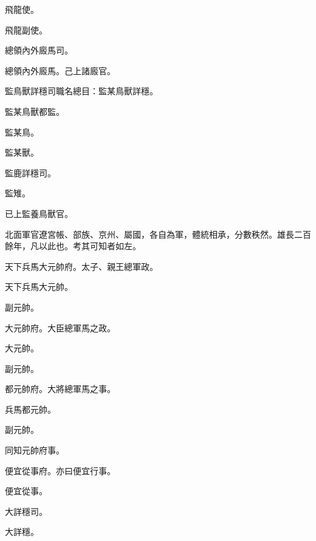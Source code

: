 \begin{pinyinscope}
 飛龍使。



 飛龍副使。



 總領內外廄馬司。



 總領內外廄馬。己上諸廄官。



 監鳥獸詳穩司職名總目：監某鳥獸詳穩。



 監某鳥獸都監。



 監某鳥。



 監某獸。



 監鹿詳穩司。



 監雉。



 已上監養鳥獸官。



 北面軍官遼宮帳、部族、京州、屬國，各自為軍，體統相承，分數秩然。雄長二百餘年，凡以此也。考其可知者如左。



 天下兵馬大元帥府。太子、親王總軍政。



 天下兵馬大元帥。



 副元帥。



 大元帥府。大臣總軍馬之政。



 大元帥。



 副元帥。



 都元帥府。大將總軍馬之事。



 兵馬都元帥。



 副元帥。



 同知元帥府事。



 便宜從事府。亦曰便宜行事。



 便宜從事。



 大詳穩司。



 大詳穩。




\end{pinyinscope}
